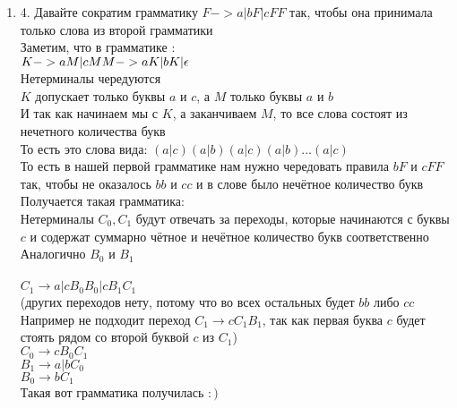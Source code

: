 \documentclass[12pt]{article}
\newenvironment{MyList}[1][4pt]{
  \begin{enumerate}[1.]
  \setlength{\parskip}{0pt}
  \setlength{\itemsep}{#1}
}{       
  \end{enumerate}
}
\begin{document}
\begin{MyList}[8pt]
 \item [4.] Давайте сократим грамматику $F -> a | bF | cFF$ так, чтобы она принимала только слова из второй грамматики \\
 Заметим, что в грамматике : \\
 $K -> aM | cM \\ M -> aK | bK | \epsilon$ \\
 Нетерминалы чередуются\\ $K$ допускает только буквы $a$ и $c$, а $M$ только буквы $a$ и $b$ \\
 И так как начинаем мы с $K$, а заканчиваем $M$, то все слова состоят из нечетного количества букв \\
 То есть это слова вида: $(a|c)(a|b)(a|c)(a|b)...(a|c)$ \\ 
 То есть в нашей первой грамматике нам нужно чередовать правила $bF$ и $cFF$ так, чтобы не оказалось $bb$ и $cc$ и в слове было нечётное количество букв\\
 Получается такая грамматика: \\
 \newpage
 Нетерминалы $C_0, C_1$ будут отвечать за переходы, которые начинаются с буквы $c$ и содержат суммарно чётное и нечётное количество букв соответственно \\
 Аналогично $B_0$ и $B_1$ \\  
 \\
 $C_1 \to a | cB_0B_0 | cB_1C_1$ \\
 (других переходов нету, потому что во всех остальных будет $bb$ либо $cc$ \\
 Например не подходит переход $C_1 \to cC_1B_1$, так как первая буква $c$ будет стоять рядом со второй буквой $c$ из $C_1$) \\
 $C_0 \to cB_0C_1$ \\
 $B_1 \to a | bC_0$ \\
 $B_0 \to bC_1$ \\
 Такая вот грамматика получилась $:)$
 
  
\end{MyList}
\end{document}
